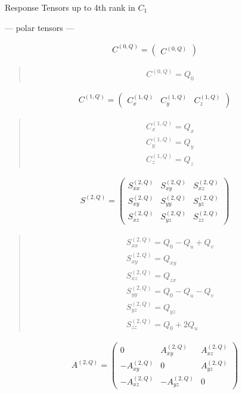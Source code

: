 \documentclass[fleqn,10pt]{jsarticle}
\begin{document}
\setcounter{MaxMatrixCols}{16}

\begin{center}
\LARGE
Response Tensors up to 4th rank in $C_{1}$
\end{center}
\begin{center}\LARGE --- polar tensors ---\end{center}
\begin{align*}
C^{(0,Q)} = \begin{pmatrix} C^{(0,Q)} \end{pmatrix}
\end{align*}
\begin{quote}
\begin{align*}
& C^{(0,Q)} = Q_{0}
\end{align*}
\end{quote}
\begin{align*}
C^{(1,Q)} = \begin{pmatrix} C^{(1,Q)}_{x} & C^{(1,Q)}_{y} & C^{(1,Q)}_{z} \end{pmatrix}
\end{align*}
\begin{quote}
\begin{align*}
& C^{(1,Q)}_{x} = Q_{x} \\
& C^{(1,Q)}_{y} = Q_{y} \\
& C^{(1,Q)}_{z} = Q_{z}
\end{align*}
\end{quote}
\begin{align*}
S^{(2,Q)} = \begin{pmatrix} S^{(2,Q)}_{xx} & S^{(2,Q)}_{xy} & S^{(2,Q)}_{xz} \\ S^{(2,Q)}_{xy} & S^{(2,Q)}_{yy} & S^{(2,Q)}_{yz} \\ S^{(2,Q)}_{xz} & S^{(2,Q)}_{yz} & S^{(2,Q)}_{zz} \end{pmatrix}
\end{align*}
\begin{quote}
\begin{align*}
& S^{(2,Q)}_{xx} = Q_{0} - Q_{u} + Q_{v} \\
& S^{(2,Q)}_{xy} = Q_{xy} \\
& S^{(2,Q)}_{xz} = Q_{zx} \\
& S^{(2,Q)}_{yy} = Q_{0} - Q_{u} - Q_{v} \\
& S^{(2,Q)}_{yz} = Q_{yz} \\
& S^{(2,Q)}_{zz} = Q_{0} + 2 Q_{u}
\end{align*}
\end{quote}
\begin{align*}
A^{(2,Q)} = \begin{pmatrix} 0 & A^{(2,Q)}_{xy} & A^{(2,Q)}_{xz} \\ - A^{(2,Q)}_{xy} & 0 & A^{(2,Q)}_{yz} \\ - A^{(2,Q)}_{xz} & - A^{(2,Q)}_{yz} & 0 \end{pmatrix}
\end{align*}
\end{document}

